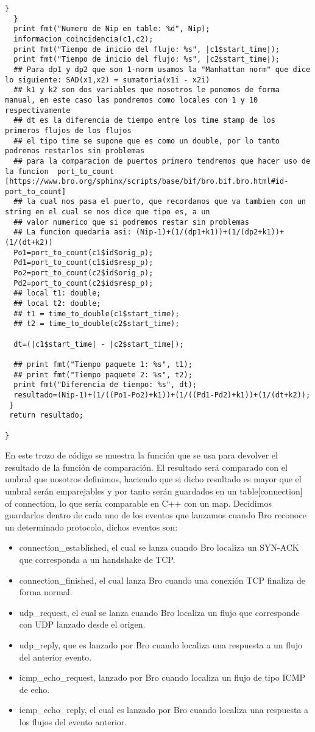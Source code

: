 \begin{lstlisting}[style=CodigoC]
    }
  }
  print fmt("Numero de Nip en table: %d", Nip);
  informacion_coincidencia(c1,c2);
  print fmt("Tiempo de inicio del flujo: %s", |c1$start_time|);
  print fmt("Tiempo de inicio del flujo: %s", |c2$start_time|);
  ## Para dp1 y dp2 que son 1-norm usamos la "Manhattan norm" que dice lo siguiente: SAD(x1,x2) = sumatoria(x1i - x2i)
  ## k1 y k2 son dos variables que nosotros le ponemos de forma manual, en este caso las pondremos como locales con 1 y 10 respectivamente
  ## dt es la diferencia de tiempo entre los time stamp de los primeros flujos de los flujos
  ## el tipo time se supone que es como un double, por lo tanto podremos restarlos sin problemas
  ## para la comparacion de puertos primero tendremos que hacer uso de la funcion  port_to_count [https://www.bro.org/sphinx/scripts/base/bif/bro.bif.bro.html#id-port_to_count]
  ## la cual nos pasa el puerto, que recordamos que va tambien con un string en el cual se nos dice que tipo es, a un
  ## valor numerico que si podremos restar sin problemas
  ## La funcion quedaria asi: (Nip-1)+(1/(dp1+k1))+(1/(dp2+k1))+(1/(dt+k2))
  Po1=port_to_count(c1$id$orig_p);
  Pd1=port_to_count(c1$id$resp_p);
  Po2=port_to_count(c2$id$orig_p);
  Pd2=port_to_count(c2$id$resp_p);
  ## local t1: double;
  ## local t2: double;
  ## t1 = time_to_double(c1$start_time);
  ## t2 = time_to_double(c2$start_time);

  dt=(|c1$start_time| - |c2$start_time|);

  ## print fmt("Tiempo paquete 1: %s", t1);
  ## print fmt("Tiempo paquete 2: %s", t2);
  print fmt("Diferencia de tiempo: %s", dt);
  resultado=(Nip-1)+(1/((Po1-Po2)+k1))+(1/((Pd1-Pd2)+k1))+(1/(dt+k2));
 }
 return resultado;

}
\end{lstlisting}
En este trozo de código se muestra la función que se usa para devolver 
el resultado de la función de comparación. El resultado será comparado 
con el umbral que nosotros definimos, haciendo que si dicho resultado 
es mayor que el umbral serán emparejables y por tanto serán guardados 
en un table[connection] of connection, lo que sería comparable en C++ 
con un map. Decidimos guardarlos dentro de cada uno de los eventos que 
lanzamos cuando Bro reconoce un determinado protocolo, dichos eventos son:
\intro
\begin{itemize}
\item connection\_established, el cual se lanza cuando Bro localiza un SYN-ACK que corresponda a un handshake de TCP.
\item connection\_finished, el cual lanza Bro cuando una conexión TCP finaliza de forma normal. 
\item udp\_request, el cual se lanza cuando Bro localiza un flujo que corresponde con UDP lanzado desde el origen.
\item udp\_reply, que es lanzado por Bro cuando localiza una respuesta a un flujo del anterior evento.
\item icmp\_echo\_request, lanzado por Bro cuando localiza un flujo de tipo ICMP de echo.
\item icmp\_echo\_reply, el cual es lanzado por Bro cuando localiza una respuesta a los flujos del evento anterior.
\end{itemize}

